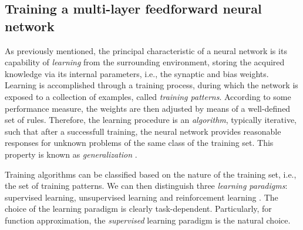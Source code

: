 \documentclass[longtitle]{elsarticle}
\numberwithin{equation}{section}
\theoremstyle{theorem}
\theoremstyle{definition}
\theoremstyle{remark}
\theoremstyle{proposition}
\numberwithin{figure}{section}
\begin{document}
		
	
	\subsection{Training a multi-layer feedforward neural network}
	\label{section:Training a multi-layer feedforward neural network}
	
		As previously mentioned, the principal characteristic of a neural network is its capability of \emph{learning} from the surrounding environment, storing the acquired knowledge via its internal parameters, i.e., the synaptic and bias weights. Learning is accomplished through a training process, during which the network is exposed to a collection of examples, called \emph{training patterns}. According to some performance measure, the weights are then adjusted by means of a well-defined set of rules. Therefore, the learning procedure is an \emph{algorithm}, typically iterative, such that after a successfull training, the neural network provides reasonable responses for unknown problems of the same class of the training set. This property is known as \emph{generalization} \cite{Kri07}. 
		
		Training algorithms can be classified based on the nature of the training set, i.e., the set of training patterns. We can then distinguish three \emph{learning paradigms}: supervised learning, unsupervised learning and reinforcement learning \cite{Hag14}. The choice of the learning paradigm is clearly task-dependent. Particularly, for function approximation, the \emph{supervised} learning paradigm is the natural choice. 
		
\end{document}
